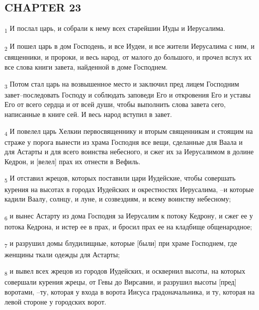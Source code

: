 \subsection{CHAPTER 23}
\begin{tcolorbox}
\textsubscript{1} И послал царь, и собрали к нему всех старейшин Иуды и Иерусалима.
\end{tcolorbox}
\begin{tcolorbox}
\textsubscript{2} И пошел царь в дом Господень, и все Иудеи, и все жители Иерусалима с ним, и священники, и пророки, и весь народ, от малого до большого, и прочел вслух их все слова книги завета, найденной в доме Господнем.
\end{tcolorbox}
\begin{tcolorbox}
\textsubscript{3} Потом стал царь на возвышенное место и заключил пред лицем Господним завет--последовать Господу и соблюдать заповеди Его и откровения Его и уставы Его от всего сердца и от всей души, чтобы выполнить слова завета сего, написанные в книге сей. И весь народ вступил в завет.
\end{tcolorbox}
\begin{tcolorbox}
\textsubscript{4} И повелел царь Хелкии первосвященнику и вторым священникам и стоящим на страже у порога вынести из храма Господня все вещи, сделанные для Ваала и для Астарты и для всего воинства небесного, и сжег их за Иерусалимом в долине Кедрон, и [велел] прах их отнести в Вефиль.
\end{tcolorbox}
\begin{tcolorbox}
\textsubscript{5} И отставил жрецов, которых поставили цари Иудейские, чтобы совершать курения на высотах в городах Иудейских и окрестностях Иерусалима, --и которые кадили Ваалу, солнцу, и луне, и созвездиям, и всему воинству небесному;
\end{tcolorbox}
\begin{tcolorbox}
\textsubscript{6} и вынес Астарту из дома Господня за Иерусалим к потоку Кедрону, и сжег ее у потока Кедрона, и истер ее в прах, и бросил прах ее на кладбище общенародное;
\end{tcolorbox}
\begin{tcolorbox}
\textsubscript{7} и разрушил домы блудилищные, которые [были] при храме Господнем, где женщины ткали одежды для Астарты;
\end{tcolorbox}
\begin{tcolorbox}
\textsubscript{8} и вывел всех жрецов из городов Иудейских, и осквернил высоты, на которых совершали курения жрецы, от Гевы до Вирсавии, и разрушил высоты [пред] воротами, --ту, которая у входа в ворота Иисуса градоначальника, и ту, которая на левой стороне у городских ворот.
\end{tcolorbox}
